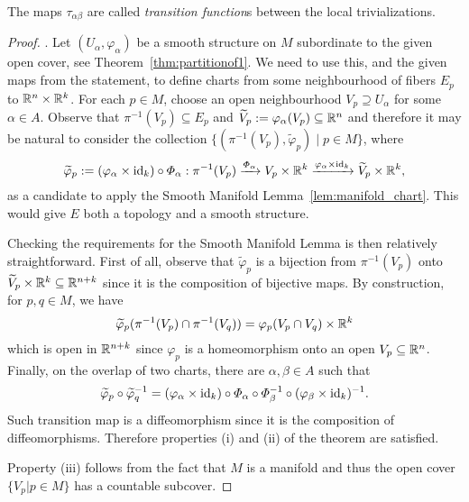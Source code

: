 The maps $\tau_{\alpha\beta}$ are called \emph{transition function}s between the local trivializations.
\begin{proof}
	.
	Let $(U_\alpha, \varphi_\alpha)$ be a smooth structure on $M$ subordinate to the given open cover, see Theorem~\ref{thm:partitionof1}.
	We need to use this, and the given maps from the statement, to define charts from some neighbourhood of fibers $E_p$ to $\mathbb{R}^n\times\mathbb{R}^k$.
	For each $p\in M$, choose an open neighbourhood $V_p \supseteq U_\alpha$ for some $\alpha\in A$.
	Observe that $\pi^{-1}(V_p) \subseteq E_p$ and $\widetilde{V}_p := \varphi_\alpha(V_p) \subseteq \mathbb{R}^n$ and therefore it may be natural to consider the collection $\{(\pi^{-1}(V_p), \widetilde{\varphi}_p)\mid p\in M\}$, where
	\begin{equation}
		\widetilde{\varphi}_p := (\varphi_\alpha\times \operatorname{id}_k) \circ \varPhi_\alpha : \pi^{-1}(V_p) \xrightarrow{\varPhi_\alpha} V_p\times\mathbb{R}^k \xrightarrow{\varphi_\alpha\times \operatorname{id}_k} \widetilde{V}_p\times \mathbb{R}^k,
	\end{equation}
	as a candidate to apply the Smooth Manifold Lemma~\ref{lem:manifold_chart}.
	This would give $E$ both a topology and a smooth structure.

	Checking the requirements for the Smooth Manifold Lemma is then relatively straightforward.
	First of all, observe that $\widetilde{\varphi}_p$ is a bijection from $\pi^{-1}(V_p)$ onto $\widetilde{V}_p\times\mathbb{R}^k \subseteq \mathbb{R}^{n+k}$ since it is the composition of bijective maps.
	By construction, for $p,q\in M$, we have
	\begin{equation}
		\widetilde{\varphi}_p(\pi^{-1}(V_p) \cap \pi^{-1}(V_q)) = \varphi_p(V_p\cap V_q)\times \mathbb{R}^k
	\end{equation}
	which is open in $\mathbb{R}^{n+k}$ since $\varphi_p$ is a homeomorphism onto an open $V_p\subseteq\mathbb{R}^n$.
	Finally, on the overlap of two charts, there are $\alpha, \beta\in A$ such that
	\begin{equation}
		\widetilde{\varphi}_p \circ \widetilde{\varphi}_q^{-1} =
		(\varphi_\alpha \times \operatorname{id}_k) \circ \varPhi_\alpha \circ \varPhi_\beta^{-1} \circ (\varphi_\beta \times \operatorname{id}_k)^{-1}.
	\end{equation}
	Such transition map is a diffeomorphism since it is the composition of diffeomorphisms.
	Therefore properties (i) and (ii) of the theorem are satisfied.

	Property (iii) follows from the fact that $M$ is a manifold and thus the open cover $\{V_p | p \in M\}$ has a countable subcover.


\end{proof}
